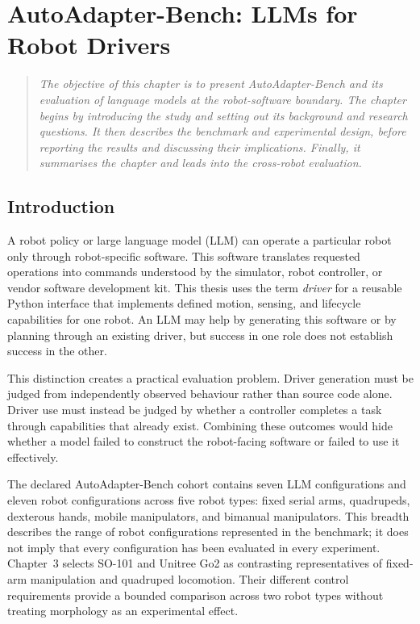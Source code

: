 \chapter[AutoAdapter-Bench]{AutoAdapter-Bench: LLMs for Robot Drivers}
\label{chapter:autoadapter-bench}

\begin{quote}\itshape
The objective of this chapter is to present AutoAdapter-Bench and its evaluation
of language models at the robot-software boundary. The chapter begins by
introducing the study and setting out its background and research questions. It
then describes the benchmark and experimental design, before reporting the
results and discussing their implications. Finally, it summarises the chapter
and leads into the cross-robot evaluation.
\end{quote}

\section[Introduction]{Introduction}

A robot policy or large language model (LLM) can operate a particular robot
only through robot-specific software. This software translates requested
operations into commands understood by the simulator, robot controller, or
vendor software development kit. This thesis uses the term \emph{driver} for
a reusable Python interface that implements defined motion, sensing, and
lifecycle capabilities for one robot. An LLM may help by generating this
software or by planning through an existing driver, but success in one role
does not establish success in the other.

This distinction creates a practical evaluation problem. Driver generation
must be judged from independently observed behaviour rather than source code
alone. Driver use must instead be judged by whether a controller completes a
task through capabilities that already exist. Combining these outcomes would
hide whether a model failed to construct the robot-facing software or failed
to use it effectively.

The declared AutoAdapter-Bench cohort contains seven LLM configurations and
eleven robot configurations across five robot types: fixed serial arms,
quadrupeds, dexterous hands, mobile manipulators, and bimanual manipulators.
This breadth describes the range of robot configurations represented in the
benchmark; it does not imply that every configuration has been evaluated in
every experiment. Chapter~3 selects SO-101 and Unitree Go2 as contrasting
representatives of fixed-arm manipulation and quadruped locomotion. Their
different control requirements provide a bounded comparison across two robot
types without treating morphology as an experimental effect.

